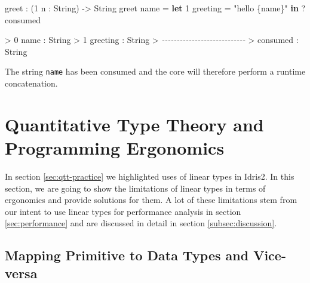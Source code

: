 \documentclass[
]{article}
\newenvironment{Shaded}{}{}
\newcommand{\CommentTok}[1]{\textcolor[rgb]{0.38,0.63,0.69}{\textit{#1}}}
\newcommand{\DataTypeTok}[1]{\textcolor[rgb]{0.56,0.13,0.00}{#1}}
\newcommand{\DecValTok}[1]{\textcolor[rgb]{0.25,0.63,0.44}{#1}}
\newcommand{\KeywordTok}[1]{\textcolor[rgb]{0.00,0.44,0.13}{\textbf{#1}}}
\newcommand{\NormalTok}[1]{#1}
\newcommand{\OperatorTok}[1]{\textcolor[rgb]{0.40,0.40,0.40}{#1}}
\newcommand{\OtherTok}[1]{\textcolor[rgb]{0.00,0.44,0.13}{#1}}
\newcommand{\StringTok}[1]{\textcolor[rgb]{0.25,0.44,0.63}{#1}}
\begin{document}
\begin{Shaded}
\begin{Highlighting}[]
\NormalTok{greet }\OperatorTok{:}\NormalTok{ (}\DecValTok{1}\NormalTok{ n }\OperatorTok{:} \DataTypeTok{String}\NormalTok{) }\OtherTok{{-}\textgreater{}} \DataTypeTok{String}
\NormalTok{greet name }\OtherTok{=} \KeywordTok{let} \DecValTok{1}\NormalTok{ greeting }\OtherTok{=} \StringTok{"hello \{name\}"} \KeywordTok{in} \OperatorTok{?}\NormalTok{consumed}
\end{Highlighting}
\end{Shaded}

\begin{Shaded}
\begin{Highlighting}[]
\OperatorTok{\textgreater{}} \DecValTok{0}\NormalTok{ name }\OperatorTok{:} \DataTypeTok{String}
\OperatorTok{\textgreater{}} \DecValTok{1}\NormalTok{ greeting }\OperatorTok{:} \DataTypeTok{String}
\OperatorTok{\textgreater{}} \CommentTok{{-}{-}{-}{-}{-}{-}{-}{-}{-}{-}{-}{-}{-}{-}{-}{-}{-}{-}{-}{-}{-}{-}{-}{-}{-}{-}{-}{-}}
\OperatorTok{\textgreater{}}\NormalTok{ consumed }\OperatorTok{:} \DataTypeTok{String}
\end{Highlighting}
\end{Shaded}

The string \texttt{name} has been consumed and the core will therefore
perform a runtime concatenation.

\newpage

\hypertarget{quantitative-type-theory-and-programming-ergonomics}{%
\section{Quantitative Type Theory and Programming
Ergonomics}\label{quantitative-type-theory-and-programming-ergonomics}}

\label{sec:qtt-ergonomics}

In section \ref{sec:qtt-practice} we highlighted uses of linear types in
Idris2. In this section, we are going to show the limitations of linear
types in terms of ergonomics and provide solutions for them. A lot of
these limitations stem from our intent to use linear types for
performance analysis in section \ref{sec:performance} and are discussed
in detail in section \ref{subsec:discussion}.

\hypertarget{mapping-primitive-to-data-types-and-vice-versa}{%
\subsection{Mapping Primitive to Data Types and
Vice-versa}\label{mapping-primitive-to-data-types-and-vice-versa}}
\end{document}
